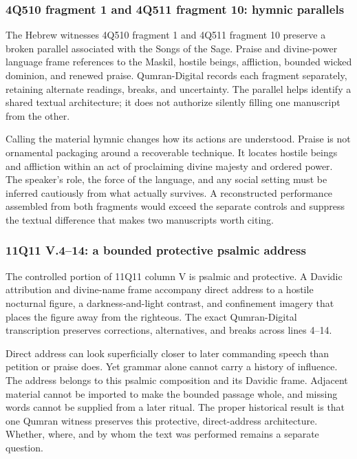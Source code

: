 \subsubsection{4Q510 fragment 1 and 4Q511 fragment 10: hymnic parallels}

The Hebrew witnesses 4Q510 fragment 1 and 4Q511 fragment 10 preserve a broken
parallel associated with the Songs of the Sage. Praise and divine-power
language frame references to the Maskil, hostile beings, affliction, bounded
wicked dominion, and renewed praise. Qumran-Digital records each fragment
separately, retaining alternate readings, breaks, and uncertainty. The
parallel helps identify a shared textual architecture; it does not authorize
silently filling one manuscript from the other.

Calling the material hymnic changes how its actions are understood. Praise is
not ornamental packaging around a recoverable technique. It locates hostile
beings and affliction within an act of proclaiming divine majesty and ordered
power. The speaker's role, the force of the language, and any social setting
must be inferred cautiously from what actually survives. A reconstructed
performance assembled from both fragments would exceed the separate controls
and suppress the textual difference that makes two manuscripts worth citing.

\subsubsection{11Q11 V.4--14: a bounded protective psalmic address}

The controlled portion of 11Q11 column V is psalmic and protective. A Davidic
attribution and divine-name frame accompany direct address to a hostile
nocturnal figure, a darkness-and-light contrast, and confinement imagery that
places the figure away from the righteous. The exact Qumran-Digital
transcription preserves corrections, alternatives, and breaks across lines
4--14.

Direct address can look superficially closer to later commanding speech than
petition or praise does. Yet grammar alone cannot carry a history of
influence. The address belongs to this psalmic composition and its Davidic
frame. Adjacent material cannot be imported to make the bounded passage whole,
and missing words cannot be supplied from a later ritual. The proper
historical result is that one Qumran witness preserves this protective,
direct-address architecture. Whether, where, and by whom the text was
performed remains a separate question.

